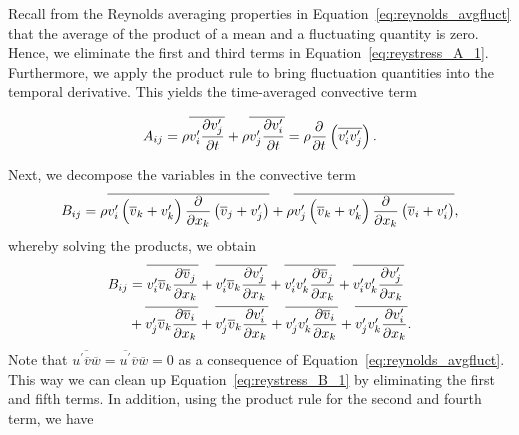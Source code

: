 Recall from the Reynolds averaging properties in Equation~\ref{eq:reynolds_avgfluct} that the average of the product of a mean and a fluctuating quantity is zero. Hence, we eliminate the first and third terms in Equation~\ref{eq:reystress_A_1}. Furthermore, we apply the product rule to bring fluctuation quantities into the temporal derivative. This yields the time-averaged convective term
\begin{eqBox}
\begin{equation}
	A_{ij}
	= \rho \overline{v_i^\prime\frac{\partial v_j^\prime}{\partial t}}
	+ \rho \overline{v_j^\prime\frac{\partial v_{i\vphantom{j}}^\prime}{\partial t}} 
	= \rho \frac{\partial}{\partial t} \left(\overline{v_i^\prime v_j^\prime}\right).
\end{equation}
\end{eqBox}
Next, we decompose the variables in the convective term
\begin{equation}
	B_{ij} =
	\rho \overline{v_i^\prime \left(\overline v_k+v_{k\vphantom{j}}^\prime\right)\frac{\partial}{\partial x_k}\left(\overline v_j+v_j^\prime\right)}
	+ \rho \overline{v_j^\prime \left(\overline v_k+v_{k\vphantom{j}}^\prime\right)\frac{\partial}{\partial x_k}\left(\overline v_i+v_{i\vphantom{j}}^\prime\right)},
\end{equation} 
whereby solving the products, we obtain
\begin{equation}
	\begin{aligned}
	B_{ij} &=
	\overline{v_i^\prime\overline v_k \frac{\partial\overline v_j^{\vphantom{\prime}}}{\partial x_k} }
	+ \overline{v_i^\prime\overline v_k \frac{\partial v_j^\prime}{\partial x_k} }
	+ \overline{v_i^\prime v_k^\prime \frac{\partial\overline v_j^{\vphantom{\prime}}}{\partial x_k} }
	+ \overline{v_i^\prime v_k^\prime \frac{\partial v_j^\prime}{\partial x_k} } \\
	&+ \overline{v_j^\prime\overline v_k \frac{\partial\overline v_i}{\partial x_k} }
	+ \overline{v_j^\prime\overline v_k \frac{\partial v_i^\prime}{\partial x_k} }
	+ \overline{v_j^\prime v_k^\prime \frac{\partial\overline v_i}{\partial x_k} }
	+ \overline{v_j^\prime v_k^\prime \frac{\partial v_i^\prime}{\partial x_k} }.
	\end{aligned}
	\label{eq:reystress_B_1}
\end{equation}
Note that $\overline{u^\prime \overline v \overline w} = \overline{u^\prime} \overline v \overline w = 0$ as a consequence of Equation~\ref{eq:reynolds_avgfluct}. This way we can clean up Equation~\ref{eq:reystress_B_1} by eliminating the first and fifth terms. In addition, using the product rule for the second and fourth term, we have
